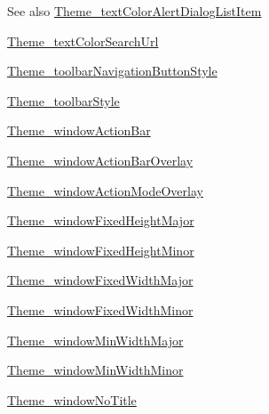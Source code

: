 \begin{DoxySeeAlso}{See also}
\hyperlink{classcheck_1_1test_1_1_r_1_1styleable_a1c80e17e0c7244efe703fdaec5710c66}{Theme\+\_\+text\+Color\+Alert\+Dialog\+List\+Item} 

\hyperlink{classcheck_1_1test_1_1_r_1_1styleable_ac9bde1fe29dd51a5aa9486cce5dc77cd}{Theme\+\_\+text\+Color\+Search\+Url} 

\hyperlink{classcheck_1_1test_1_1_r_1_1styleable_a17c17271f93cd157c12fec0dd05f41e2}{Theme\+\_\+toolbar\+Navigation\+Button\+Style} 

\hyperlink{classcheck_1_1test_1_1_r_1_1styleable_a3e0a6d9c5645dc0e8bc6e32efbf36b28}{Theme\+\_\+toolbar\+Style} 

\hyperlink{classcheck_1_1test_1_1_r_1_1styleable_adc8b4e64798d8c55e475a6440a5c6aac}{Theme\+\_\+window\+Action\+Bar} 

\hyperlink{classcheck_1_1test_1_1_r_1_1styleable_adc29b18d7459f89f6028a65608a1e6c8}{Theme\+\_\+window\+Action\+Bar\+Overlay} 

\hyperlink{classcheck_1_1test_1_1_r_1_1styleable_a5abe584f47941f3243c037bca83f20fd}{Theme\+\_\+window\+Action\+Mode\+Overlay} 

\hyperlink{classcheck_1_1test_1_1_r_1_1styleable_a9e8a42067e25b6c873f7293e9bee1343}{Theme\+\_\+window\+Fixed\+Height\+Major} 

\hyperlink{classcheck_1_1test_1_1_r_1_1styleable_a8aa80c12e9d59fb6879aaf0273377731}{Theme\+\_\+window\+Fixed\+Height\+Minor} 

\hyperlink{classcheck_1_1test_1_1_r_1_1styleable_aba8175a4427847a30a88e449000d7412}{Theme\+\_\+window\+Fixed\+Width\+Major} 

\hyperlink{classcheck_1_1test_1_1_r_1_1styleable_ad9f0c51f93dc1efedfd42524c8d2acea}{Theme\+\_\+window\+Fixed\+Width\+Minor} 

\hyperlink{classcheck_1_1test_1_1_r_1_1styleable_affa53ed5805b4fc7b71d664cddc7b88e}{Theme\+\_\+window\+Min\+Width\+Major} 

\hyperlink{classcheck_1_1test_1_1_r_1_1styleable_aa7f575c9c5c290ba568031edf16a3bc6}{Theme\+\_\+window\+Min\+Width\+Minor} 

\hyperlink{classcheck_1_1test_1_1_r_1_1styleable_a565578f526c7a9432c574c995bc827e2}{Theme\+\_\+window\+No\+Title} 
\end{DoxySeeAlso}
\hypertarget{classcheck_1_1test_1_1_r_1_1styleable_a24a4a7345478079d2842c3c6b948cee8}{}

